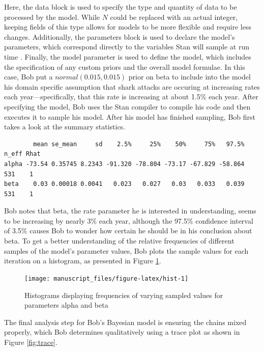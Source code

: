 \documentclass[
  12pt,
]{book}
\theoremstyle{definition}
\theoremstyle{definition}
\theoremstyle{definition}
\theoremstyle{remark}
\begin{document}
Here, the data block is used to specify the type and quantity of data to be processed by the model. While \(N\) could be replaced with an actual integer, keeping fields of this type allows for models to be more flexible and require less changes. Additionally, the parameters block is used to declare the model's parameters, which correspond directly to the variables Stan will sample at run time \citep[  8.1]{StanManual2016}. Finally, the model parameter is used to define the model, which includes the specification of any custom priors and the overall model formulae. In this case, Bob put a \(normal(0.015,0.015)\) prior on beta to include into the model his domain specific assumption that shark attacks are occuring at increasing rates each year---specifically, that this rate is increasing at about 1.5\% each year. After specifying the model, Bob uses the Stan compiler to compile his code and then executes it to sample his model. After his model has finished sampling, Bob first takes a look at the summary statistics.

\begin{verbatim}
        mean se_mean     sd    2.5%     25%    50%     75%   97.5% n_eff Rhat
alpha -73.54 0.35745 8.2343 -91.320 -78.804 -73.17 -67.829 -58.864   531    1
beta    0.03 0.00018 0.0041   0.023   0.027   0.03   0.033   0.039   531    1
\end{verbatim}

Bob notes that beta, the rate parameter he is interested in understanding, seems to be increasing by nearly 3\% each year, although the 97.5\% confidence interval of 3.5\% causes Bob to wonder how certain he should be in his conclusion about beta. To get a better understanding of the relative frequencies of different samples of the model's parameter values, Bob plots the sample values for each iteration on a histogram, as presented in Figure \ref{fig:hist}.

\begin{figure}

{\centering \texttt{[image: manuscript\_files/figure-latex/hist-1]} 

}

\caption{Histograms displaying frequencies of varying sampled values for parameters alpha and beta}\label{fig:hist}
\end{figure}

The final analysis step for Bob's Bayesian model is ensuring the chains mixed properly, which Bob determines qualitatively using a trace plot as shown in Figure \ref{fig:trace}.
\end{document}
